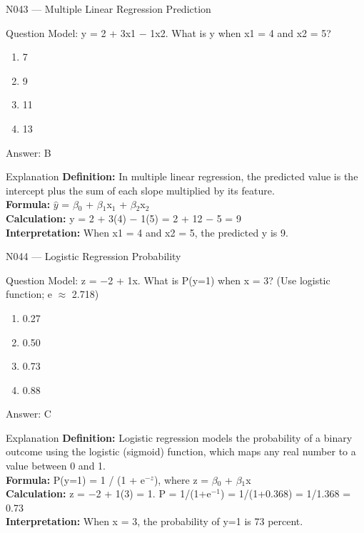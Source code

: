 \documentclass[aspectratio=169,8pt]{beamer}
\begin{document}
	\begin{frame}{N043 --- Multiple Linear Regression Prediction}
		\begin{block}{Question}
			Model: y = 2 + 3x1 $-$ 1x2. What is y when x1 = 4 and x2 = 5?
			\begin{enumerate}
				\item 7
				\item 9
				\item 11
				\item 13
			\end{enumerate}
		\end{block}
		\begin{exampleblock}{Answer: B}\end{exampleblock}
		\begin{block}{Explanation}
			\textbf{Definition:} In multiple linear regression, the predicted value is the intercept plus the sum of each slope multiplied by its feature.\\
			\textbf{Formula:} $\hat{y}$ = $\beta$$_{0}$ + $\beta$$_{1}$x$_{1}$ + $\beta$$_{2}$x$_{2}$\\
			\textbf{Calculation:} y = 2 + 3(4) $-$ 1(5) = 2 + 12 $-$ 5 = 9\\
			\textbf{Interpretation:} When x1 = 4 and x2 = 5, the predicted y is 9.
		\end{block}
	\end{frame}
	
	\begin{frame}{N044 --- Logistic Regression Probability}
		\begin{block}{Question}
			Model: z = $-$2 + 1x. What is P(y=1) when x = 3? (Use logistic function; e $\approx$ 2.718)
			\begin{enumerate}
				\item 0.27
				\item 0.50
				\item 0.73
				\item 0.88
			\end{enumerate}
		\end{block}
		\begin{exampleblock}{Answer: C}\end{exampleblock}
		\begin{block}{Explanation}
			\textbf{Definition:} Logistic regression models the probability of a binary outcome using the logistic (sigmoid) function, which maps any real number to a value between 0 and 1.\\
			\textbf{Formula:} P(y=1) = 1 / (1 + e$^{-z}$), where z = $\beta$$_{0}$ + $\beta$$_{1}$x\\
			\textbf{Calculation:} z = $-$2 + 1(3) = 1. P = 1/(1+e$^{-1}$) = 1/(1+0.368) = 1/1.368 = 0.73\\
			\textbf{Interpretation:} When x = 3, the probability of y=1 is 73 percent.
		\end{block}
	\end{frame}
	
\end{document}
